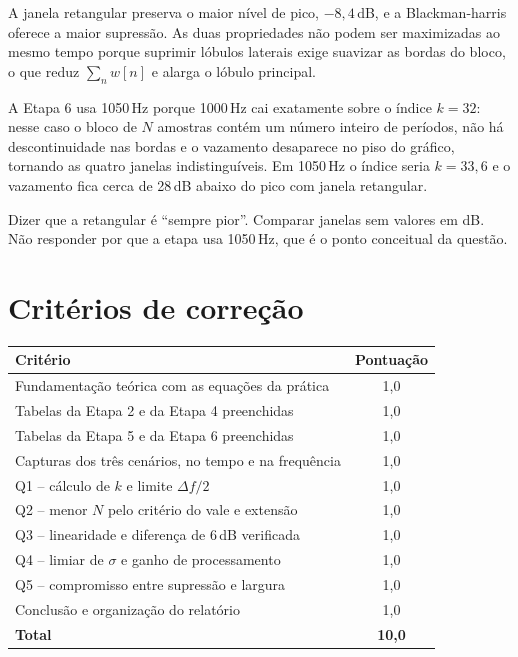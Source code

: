 \documentclass[11pt,a4paper]{article}
\begin{document}
\begin{enumerate}[label=\textbf{Q\arabic*.}, leftmargin=*, itemsep=1em]
    A janela retangular preserva o maior nível de pico, $-8{,}4$\,dB, e a
    Blackman-harris oferece a maior supressão. As duas propriedades não podem
    ser maximizadas ao mesmo tempo porque suprimir lóbulos laterais exige
    suavizar as bordas do bloco, o que reduz $\sum_n w[n]$ e alarga o lóbulo
    principal.

    A Etapa 6 usa 1050\,Hz porque 1000\,Hz cai exatamente sobre o índice
    $k = 32$: nesse caso o bloco de $N$ amostras contém um número inteiro de
    períodos, não há descontinuidade nas bordas e o vazamento desaparece no
    piso do gráfico, tornando as quatro janelas indistinguíveis. Em 1050\,Hz o
    índice seria $k = 33{,}6$ e o vazamento fica cerca de 28\,dB abaixo do pico
    com janela retangular.

    \begin{nota}
      Dizer que a retangular é ``sempre pior''. Comparar janelas sem valores em
      dB. Não responder por que a etapa usa 1050\,Hz, que é o ponto conceitual
      da questão.
    \end{nota}

\end{enumerate}

\section*{Critérios de correção}

\begin{table}[H]\centering
\begin{tabular}{l c}
  \toprule
  Critério & Pontuação \\
  \midrule
  Fundamentação teórica com as equações da prática        & 1{,}0 \\
  Tabelas da Etapa 2 e da Etapa 4 preenchidas             & 1{,}0 \\
  Tabelas da Etapa 5 e da Etapa 6 preenchidas             & 1{,}0 \\
  Capturas dos três cenários, no tempo e na frequência    & 1{,}0 \\
  Q1 -- cálculo de $k$ e limite $\Delta f/2$              & 1{,}0 \\
  Q2 -- menor $N$ pelo critério do vale e extensão        & 1{,}0 \\
  Q3 -- linearidade e diferença de 6\,dB verificada       & 1{,}0 \\
  Q4 -- limiar de $\sigma$ e ganho de processamento       & 1{,}0 \\
  Q5 -- compromisso entre supressão e largura             & 1{,}0 \\
  Conclusão e organização do relatório                    & 1{,}0 \\
  \midrule
  \textbf{Total} & \textbf{10{,}0} \\
  \bottomrule
\end{tabular}
\end{table}
\end{document}
